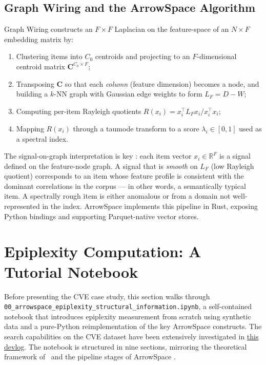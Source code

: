 \documentclass[12pt,a4paper]{article}
\theoremstyle{plain}
\theoremstyle{definition}
\theoremstyle{remark}
\newcommand{\R}{\mathbb{R}}
\newcommand{\1}{\mathbf{1}}
\begin{document}
	\subsection{Graph Wiring and the ArrowSpace Algorithm}
	
	Graph Wiring \citep{graphwiring2025} constructs an $F\times F$ Laplacian
	on the feature-space of an $N\times F$ embedding matrix by:
	
	\begin{enumerate}
		\item Clustering items into $C_0$ centroids and projecting to an
		$F$-dimensional centroid matrix $\mathbf{C}^{C_0\times F}$;
		\item Transposing $\mathbf{C}$ so that each \emph{column}
		(feature dimension) becomes a node, and building a $k$-NN
		graph with Gaussian edge weights to form $L_F = D - W$;
		\item Computing per-item Rayleigh quotients
		$R(x_i) = x_i^\top L_F x_i / x_i^\top x_i$;
		\item Mapping $R(x_i)$ through a taumode transform to a score
		$\lambda_i\in[0,1]$ used as a spectral index.
	\end{enumerate}
	
	The signal-on-graph interpretation is key \citep{ShumanDSPGraphs,
		SandryhailaDSPGraphs}: each item vector $x_i\in\R^F$ is a signal
	defined on the feature-node graph.
	A signal that is \emph{smooth} on $L_F$ (low Rayleigh quotient)
	corresponds to an item whose feature profile is consistent with the
	dominant correlations in the corpus --- in other words, a
	semantically typical item.
	A spectrally rough item is either anomalous or from a domain not
	well-represented in the index.
	ArrowSpace \citep{Moriondo2025ArrowSpace} implements this pipeline in
	Rust, exposing Python bindings and supporting Parquet-native vector
	stores.
	
	\section{Epiplexity Computation: A Tutorial Notebook}
	\label{sec:prelim}
	
	Before presenting the CVE case study, this section walks through\\
	\texttt{00\_arrowspace\_epiplexity\_structural\_information.ipynb}, a
	self-contained notebook that introduces epiplexity measurement from
	scratch using synthetic data and a pure-Python reimplementation of the
	key ArrowSpace constructs. The search capabilities on the CVE dataset have been extensively investigated in \href{https://www.tuned.org.uk/blog}{this devlog}.
	The notebook is structured in nine sections, mirroring the theoretical
	framework of~\cite{finzi2026epiplexity} and the pipeline stages of
	ArrowSpace \citep{Moriondo2025ArrowSpace}.
	
\end{document}
